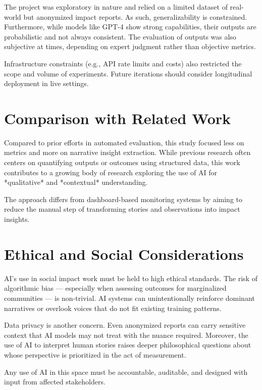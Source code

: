 The project was exploratory in nature and relied on a limited dataset of real-world but anonymized impact reports.
As such, generalizability is constrained.
Furthermore, while models like GPT-4 show strong capabilities, their outputs are probabilistic and not always consistent.
The evaluation of outputs was also subjective at times, depending on expert judgment rather than objective metrics.

Infrastructure constraints (e.g., API rate limits and costs) also restricted the scope and volume of experiments.
Future iterations should consider longitudinal deployment in live settings.

\section{Comparison with Related Work}\label{sec:comparison-with-related-work}

Compared to prior efforts in automated evaluation, this study focused less on metrics and more on narrative insight extraction.
While previous research often centers on quantifying outputs or outcomes using structured data, this work contributes to a growing body of research exploring the use of AI for *qualitative* and *contextual* understanding.

The approach differs from dashboard-based monitoring systems by aiming to reduce the manual step of transforming stories and observations into impact insights.

\section{Ethical and Social Considerations}\label{sec:ethical-and-social-considerations}

AI's use in social impact work must be held to high ethical standards.
The risk of algorithmic bias — especially when assessing outcomes for marginalized communities — is non-trivial.
AI systems can unintentionally reinforce dominant narratives or overlook voices that do not fit existing training patterns.

Data privacy is another concern.
Even anonymized reports can carry sensitive context that AI models may not treat with the nuance required.
Moreover, the use of AI to interpret human stories raises deeper philosophical questions about whose perspective is prioritized in the act of measurement.

Any use of AI in this space must be accountable, auditable, and designed with input from affected stakeholders.
